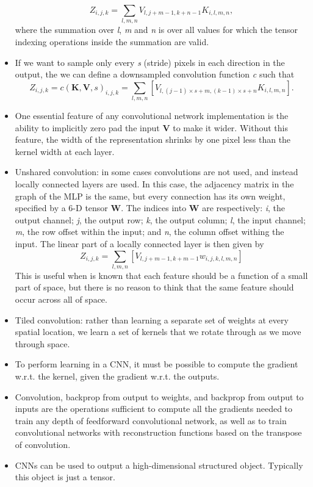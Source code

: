 \documentclass{article}
\begin{document}
\begin{itemize}
\[
	Z_{i,j,k} = \sum_{l,m,n} V_{l, j+m-1,k+n-1}K_{i,l,m,n},
\] where the summation over \textit{l}, \textit{m} and \textit{n} is over all values for which the tensor indexing operations inside the summation are valid.
\item If we want to sample only every \textit{s} (stride) pixels in each direction in the output, the we can define a downsampled convolution function \textit{c} such that
\[
	Z_{i,j,k} = c(\boldsymbol{K}, \boldsymbol{V}, s)_{i,j,k} = \sum_{l,m,n} [V_{l, (j-1)\times s+m, (k-1)\times s+n}K_{i,l,m,n}]. 
\]
\item One essential feature of any convolutional network implementation is the ability to implicitly zero pad the input \textbf{V} to make it wider. Without this feature, the width of the representation shrinks by one pixel less than the kernel width at each layer.
\item Unshared convolution: in some cases convolutions are not used, and instead locally connected layers are used. In this case, the adjacency matrix in the graph of the MLP is the same, but every connection has its own weight, specified by a 6-D tensor \textbf{W}. The indices into \textbf{W} are respectively: \textit{i}, the output channel; \textit{j}, the output row; \textit{k}, the output column; \textit{l}, the input channel; \textit{m}, the row offset within the input; and \textit{n}, the column offset withing the input. The linear part of a locally connected layer is then given by
\[
	Z_{i,j,k} = \sum_{l,m,n} [V_{l,j+m-1,k+m-1}w_{i,j,k,l,m,n}]
\]
This is useful when is known that each feature should be a function of a small part of space, but there is no reason to think that the same feature should occur across all of space.
\item Tiled convolution: rather than learning a separate set of weights at every spatial location, we learn a set of kernels that we rotate through as we move through space.
\item To perform learning in a CNN, it must be possible to compute the gradient w.r.t. the kernel, given the gradient w.r.t. the outputs.
\item Convolution, backprop from output to weights, and backprop from output to inputs are the operations sufficient to compute all the gradients needed to train any depth of feedforward convolutional network, as well as to train convolutional networks with reconstruction functions based on the transpose of convolution.
\item CNNs can be used to output a high-dimensional structured object. Typically this object is just a tensor.

\end{itemize}
\end{document}
